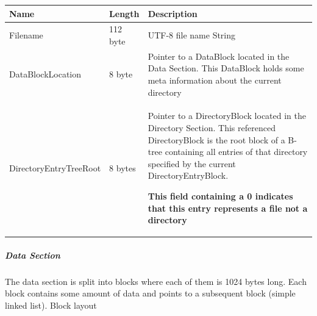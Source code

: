 \begin{tabular}{|l|l|p{5cm}|}
\hline
\textbf{Name} & \textbf{Length} & \textbf{Description}
\\  \hline

Filename & 112 byte & UTF-8 file name String


\\  \hline

DataBlockLocation & 8 byte & Pointer to a DataBlock located in the Data Section.
This DataBlock holds some meta information about the current directory


\\  \hline

DirectoryEntryTreeRoot & 8 bytes & Pointer to a DirectoryBlock located in the
Directory Section. This referenced DirectoryBlock is the root block of a B-tree
containing all entries of that directory specified by the current DirectoryEntryBlock.
\newline

\textbf{This field containing a 0 indicates that this entry represents a file not a directory}



\\  \hline

\end{tabular}


\subparagraph{Data Section}
The data section is split into blocks where each of them is 1024 bytes long.
Each block contains some amount of data and points to a subsequent block (simple
linked list).\newline\newline
Block layout \\

